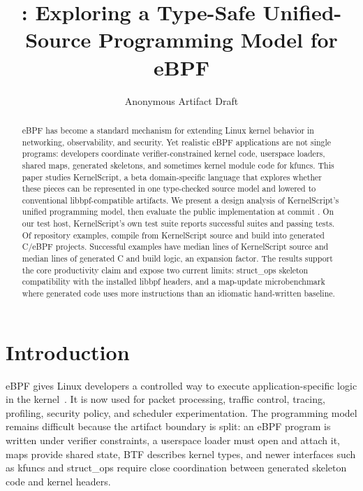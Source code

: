 \documentclass[10pt,twocolumn]{article}
\title{\vspace{-1.0em}\tool: Exploring a Type-Safe Unified-Source Programming Model for eBPF}
\author{Anonymous Artifact Draft}
\date{}
\newcommand{\tool}{KernelScript}
\begin{document}
\maketitle
\vspace{-1.4em}

\begin{abstract}
eBPF has become a standard mechanism for extending Linux kernel behavior in
networking, observability, and security.  Yet realistic eBPF applications are
not single programs: developers coordinate verifier-constrained kernel code,
userspace loaders, shared maps, generated skeletons, and sometimes kernel
module code for kfuncs.  This paper studies \tool, a beta domain-specific
language that explores whether these pieces can be represented in one
type-checked source model and lowered to conventional libbpf-compatible
artifacts.  We present a design analysis of \tool's unified programming model,
then evaluate the public implementation at commit \KSCommitShort.  On our
test host, \tool's own test suite reports \KSTotalUnitSuites{} successful
suites and \KSTotalUnitTests{} passing tests.  Of \KSTotalExamples{} repository
examples, \KSKSCompileOK{} compile from \tool{} source and \KSMakeOK{} build
into generated C/eBPF projects.  Successful examples have median
\KSMedianKSSloc{} lines of \tool{} source and median \KSMedianGeneratedSloc{}
lines of generated C and build logic, an \KSMedianGeneratedRatio{} expansion
factor.  The results support the core productivity claim and expose two
current limits: struct\_ops skeleton compatibility with the installed libbpf
headers, and a map-update microbenchmark where generated code uses more
instructions than an idiomatic hand-written baseline.
\end{abstract}

\section{Introduction}

eBPF gives Linux developers a controlled way to execute application-specific
logic in the kernel~\cite{linux-ebpf}.  It is now used for packet processing,
traffic control, tracing, profiling, security policy, and scheduler
experimentation.  The
programming model remains difficult because the artifact boundary is split:
an eBPF program is written under verifier constraints, a userspace loader must
open and attach it, maps provide shared state, BTF describes kernel types, and
newer interfaces such as kfuncs and struct\_ops require close coordination
between generated skeleton code and kernel headers.
\end{document}
